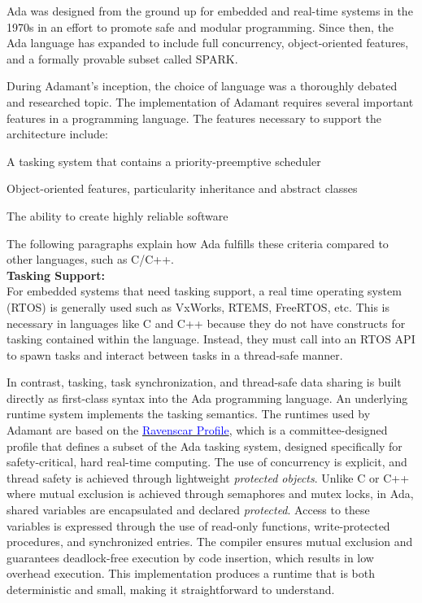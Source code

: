 Ada was designed from the ground up for embedded and real-time systems in the 1970s in an effort to promote safe and modular programming. Since then, the Ada language has expanded to include full concurrency, object-oriented features, and a formally provable subset called SPARK.

During Adamant's inception, the choice of language was a thoroughly debated and researched topic. The implementation of Adamant requires several important features in a programming language. The features necessary to support the architecture include:

\vspace{5mm} %
\begin{spacedenumerate}
  \item A tasking system that contains a priority-preemptive scheduler
  \item Object-oriented features, particularity inheritance and abstract classes
  \item The ability to create highly reliable software
\end{spacedenumerate}
\vspace{5mm} %

The following paragraphs explain how Ada fulfills these criteria compared to other languages, such as C/C++. \\

\textbf{Tasking Support:} \\

For embedded systems that need tasking support, a real time operating system (RTOS) is generally used such as VxWorks, RTEMS, FreeRTOS, etc. This is necessary in languages like C and C++ because they do not have constructs for tasking contained within the language. Instead, they must call into an RTOS API to spawn tasks and interact between tasks in a thread-safe manner.

In contrast, tasking, task synchronization, and thread-safe data sharing is built directly as first-class syntax into the Ada programming language. An underlying runtime system implements the tasking semantics. The runtimes used by Adamant are based on the \href{http://www.open-std.org/JTC1/SC22/WG9/n424.pdf}{\textcolor{blue}{Ravenscar Profile}}, which is a committee-designed profile that defines a subset of the Ada tasking system, designed specifically for safety-critical, hard real-time computing. The use of concurrency is explicit, and thread safety is achieved through lightweight \textit{protected objects}. Unlike C or C++ where mutual exclusion is achieved through semaphores and mutex locks, in Ada, shared variables are encapsulated and declared \textit{protected}. Access to these variables is expressed through the use of read-only functions, write-protected procedures, and synchronized entries. The compiler ensures mutual exclusion and guarantees deadlock-free execution by code insertion, which results in low overhead execution. This implementation produces a runtime that is both deterministic and small, making it straightforward to understand.

